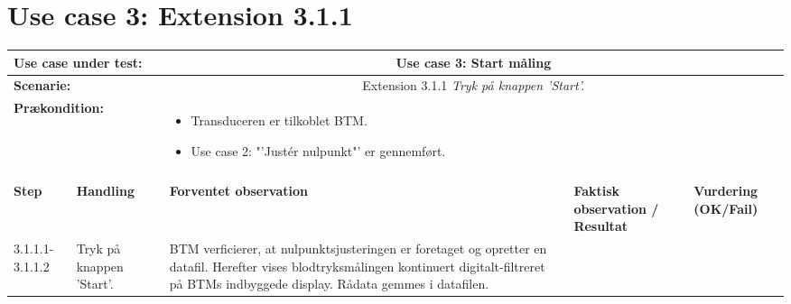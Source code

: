 \section{Use case 3: Extension 3.1.1}
\begin{tabular}{|p{1cm}|p{3cm}|p{4cm}|p{4cm}|p{2cm}|}
\hline
\multicolumn{2}{|p{3cm}|}{\textbf{Use case under test:}} & \multicolumn{3}{c|}{Use case 3: Start måling} \\\hline

\multicolumn{2}{|p{3cm}|}{\textbf{Scenarie:}} & \multicolumn{3}{c|}{Extension 3.1.1 \textit{Tryk på knappen 'Start'.}} \\\hline

\multicolumn{2}{|p{3cm}|}{\textbf{Prækondition:}}  & \multicolumn{3}{l|}{\parbox{0.6\textwidth}{
\begin{itemize}[label=$\circ$]
\item Transduceren er tilkoblet BTM.
\item Use case 2: "'Justér nulpunkt"' er gennemført. 
\end{itemize} }}\\\hline

\multicolumn{5}{|c|}{} \\\hline

\textbf{Step} & \textbf{Handling} & \textbf{Forventet observation} & \textbf{Faktisk observation / Resultat} & \textbf{Vurdering (OK/Fail)}\\\hline

3.1.1.1-3.1.1.2 & Tryk på knappen 'Start'. & BTM verficierer, at nulpunktsjusteringen er foretaget og opretter en datafil. Herefter vises blodtryksmålingen kontinuert digitalt-filtreret på BTMs indbyggede display. Rådata gemmes i datafilen. & & \\\hline
\end{tabular}




